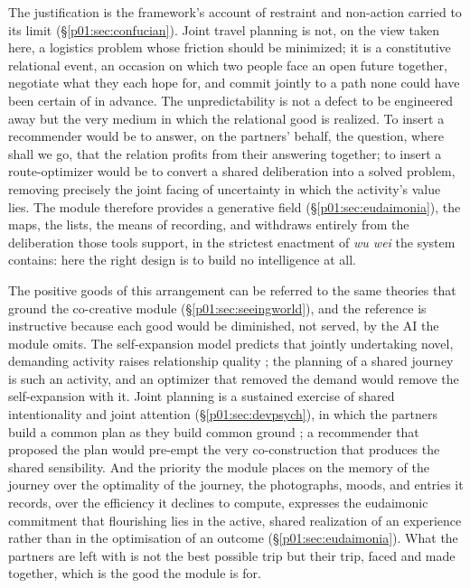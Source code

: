 The justification is the framework's account of restraint and non-action carried to its limit (§\ref{p01:sec:confucian}). Joint travel planning is not, on the view taken here, a logistics problem whose friction should be minimized; it is a constitutive relational event, an occasion on which two people face an open future together, negotiate what they each hope for, and commit jointly to a path none could have been certain of in advance. The unpredictability is not a defect to be engineered away but the very medium in which the relational good is realized. To insert a recommender would be to answer, on the partners' behalf, the question, where shall we go, that the relation profits from their answering together; to insert a route-optimizer would be to convert a shared deliberation into a solved problem, removing precisely the joint facing of uncertainty in which the activity's value lies. The module therefore provides a generative field (§\ref{p01:sec:eudaimonia}), the maps, the lists, the means of recording, and withdraws entirely from the deliberation those tools support, in the strictest enactment of \emph{wu wei} the system contains: here the right design is to build no intelligence at all.

The positive goods of this arrangement can be referred to the same theories that ground the co-creative module (§\ref{p01:sec:seeingworld}), and the reference is instructive because each good would be diminished, not served, by the AI the module omits. The self-expansion model predicts that jointly undertaking novel, demanding activity raises relationship quality \parencite{aron1986love, aron2000couples}; the planning of a shared journey is such an activity, and an optimizer that removed the demand would remove the self-expansion with it. Joint planning is a sustained exercise of shared intentionality and joint attention (§\ref{p01:sec:devpsych}), in which the partners build a common plan as they build common ground \parencite{tomasello2005intentions, clark1996using}; a recommender that proposed the plan would pre-empt the very co-construction that produces the shared sensibility. And the priority the module places on the memory of the journey over the optimality of the journey, the photographs, moods, and entries it records, over the efficiency it declines to compute, expresses the eudaimonic commitment that flourishing lies in the active, shared realization of an experience rather than in the optimisation of an outcome (§\ref{p01:sec:eudaimonia}). What the partners are left with is not the best possible trip but their trip, faced and made together, which is the good the module is for.

